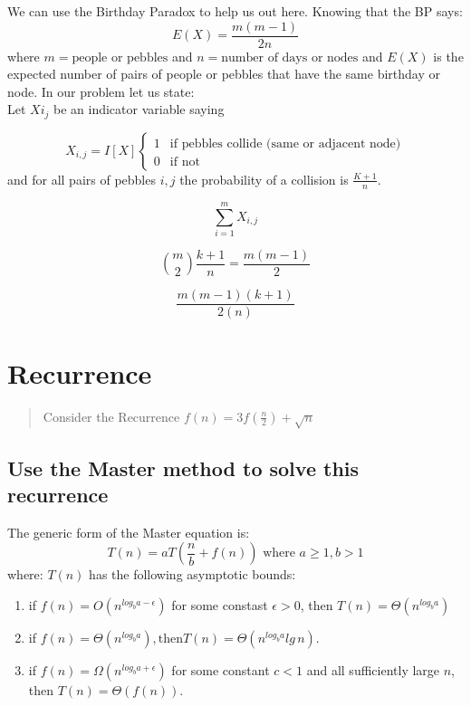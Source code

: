 \documentclass[titlepage]{article}\usepackage[]{graphicx}\usepackage[]{color}
\begin{document}
We can use the Birthday Paradox to help us out here. Knowing that the BP says:
\[ E(X) = \frac{m(m-1)}{2n} \]
where $m = \text{people or pebbles}$ and $n = \text{number of days or nodes}$
and $E(X)$ is the expected number of pairs of people or pebbles that have the
same birthday or node. In our problem let us state:\\

Let $X{i_j}$ be an indicator variable saying 

\[
	X_{i,j} = I[X]
	\begin{cases}
		1 & \text{if pebbles collide (same or adjacent node)} \\
		0 & \text{if not } 
	\end{cases}
\]
and for all pairs of pebbles $i,j$ the probability of a collision is
$\frac{K+1}{n}$.


\[ \sum_{i=1}^{m} X_{i,j} \] 

\[ {m \choose 2} \frac{k+1}{n} = \frac{m(m-1)}{2} \]

\[ \frac{m(m-1)(k+1)}{2(n)} \]



\section{Recurrence}

\begin{quote}
	Consider the Recurrence $f(n) = 3f(\frac{n}{2}) + \sqrt{n}$
\end{quote}

\subsection{Use the Master method to solve this recurrence}
The generic form of the Master equation is:
\[ T(n) = aT\left(\frac{n}{b} + f(n)\right) \text{ where } a\geq 1, b> 1 \]
where:
$T(n)$ has the following asymptotic bounds:
\begin{enumerate}
	\item if $f(n) = O\left(n^{log_b a-\epsilon}\right)$ for some constast
		$\epsilon > 0$, then $T(n) = \Theta(n^{log_b a})$
	\item if $f(n) = \Theta(n^{log_b a}), \text{then} T(n) =
		\Theta\left(n^{log_b a} lg\,n\right)$. 
	\item if $f(n) = \Omega\left(n^{log_b a + \epsilon}\right)$ for some
		constant $c < 1$ and all sufficiently large $n$, then $T(n) =
		\Theta(f(n))$. 
\end{enumerate}
\end{document}
